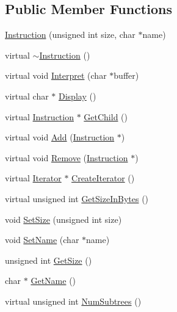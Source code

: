 \subsection*{Public Member Functions}
\begin{CompactItemize}
\item 
\hyperlink{class_babel_shark_1_1_instruction_db56af133f39de0e46b4ff08b17de68d}{Instruction} (unsigned int size, char $\ast$name)
\item 
virtual \hyperlink{class_babel_shark_1_1_instruction_e3894f3dfd5fbde200f94a90dfd64791}{$\sim$Instruction} ()
\item 
virtual void \hyperlink{class_babel_shark_1_1_instruction_bfbceb493d151b2e255c7c8cbac7a476}{Interpret} (char $\ast$buffer)
\item 
virtual char $\ast$ \hyperlink{class_babel_shark_1_1_instruction_a1d1dd6ff30235fd6842fcf4204f7698}{Display} ()
\item 
virtual \hyperlink{class_babel_shark_1_1_instruction}{Instruction} $\ast$ \hyperlink{class_babel_shark_1_1_instruction_709aac58cbdc516fcedc3bbcdd94795d}{GetChild} ()
\item 
virtual void \hyperlink{class_babel_shark_1_1_instruction_9d74c7c3cb5e2d85e065b8633a3f395a}{Add} (\hyperlink{class_babel_shark_1_1_instruction}{Instruction} $\ast$)
\item 
virtual void \hyperlink{class_babel_shark_1_1_instruction_74d0712f8c94ea4e32b3cb202d9bd06d}{Remove} (\hyperlink{class_babel_shark_1_1_instruction}{Instruction} $\ast$)
\item 
virtual \hyperlink{class_babel_shark_1_1_iterator}{Iterator} $\ast$ \hyperlink{class_babel_shark_1_1_instruction_46ee71e94270716e917ad7293fee5aca}{CreateIterator} ()
\item 
virtual unsigned int \hyperlink{class_babel_shark_1_1_instruction_4d24b597fc26a85423d9f9cf79dc9709}{GetSizeInBytes} ()
\item 
void \hyperlink{class_babel_shark_1_1_instruction_3ff4244bf92b6f03860be548b13a639e}{SetSize} (unsigned int size)
\item 
void \hyperlink{class_babel_shark_1_1_instruction_40c2bee9e484dcce78222c275030f3eb}{SetName} (char $\ast$name)
\item 
unsigned int \hyperlink{class_babel_shark_1_1_instruction_fe7f043dc99a5c72c8ac5e3ae23ab35a}{GetSize} ()
\item 
char $\ast$ \hyperlink{class_babel_shark_1_1_instruction_681336e7e2ff12cfbe4a67ac657108da}{GetName} ()
\item 
virtual unsigned int \hyperlink{class_babel_shark_1_1_instruction_da0c4af8c73c7aae8b8d3a32a09f11e4}{NumSubtrees} ()
\end{CompactItemize}
